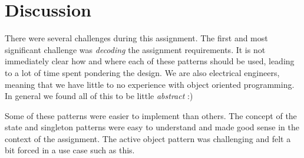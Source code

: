 \documentclass[../main.tex]{subfiles}
\begin{document}
\newpage

\section{Discussion}

There were several challenges during this assignment. The first and most significant challenge was \textit{decoding} the assignment requirements. It is not immediately clear how and where each of these patterns should be used, leading to a lot of time spent pondering the design. We are also electrical engineers, meaning that we have little to no experience with object oriented programming. In general we found all of this to be little \textit{abstract} :)

\vspace{10pt}
Some of these patterns were easier to implement than others. The concept of the state and singleton patterns were easy to understand and made good sense in the context of the assignment. The active object pattern was challenging and felt a bit forced in a use case such as this.
\end{document}
